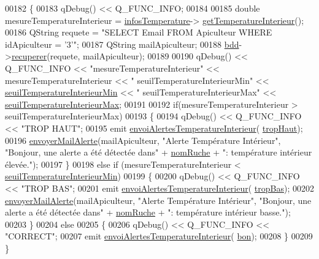 \begin{DoxyCode}
00182 \{
00183     qDebug() << Q\_FUNC\_INFO;
00184 
00185     \textcolor{keywordtype}{double} mesureTemperatureInterieur = \hyperlink{class_alertes_ad02b203545812ad6408befecc94ee0ec}{infosTemperature}->
      \hyperlink{class_infos_temperature_aaf4cb4fd8a7c46d14955d3175498f91c}{getTemperatureInterieur}();
00186     QString requete = \textcolor{stringliteral}{"SELECT Email FROM Apiculteur WHERE idApiculteur = '3'"};
00187     QString mailApiculteur;
00188     \hyperlink{class_alertes_a91e58b69d29922e8e984efb767ae5268}{bdd}->\hyperlink{class_base_de_donnees_a77539baad389f5acf754cd2cd452403e}{recuperer}(requete, mailApiculteur);
00189 
00190     qDebug() << Q\_FUNC\_INFO << \textcolor{stringliteral}{"mesureTemperatureInterieur"} << mesureTemperatureInterieur << \textcolor{stringliteral}{"
      seuilTemperatureInterieurMin"} << \hyperlink{class_alertes_a1c970252300a177bef641ca5399d3783}{seuilTemperatureInterieurMin} << \textcolor{stringliteral}{"
      seuilTemperatureInterieurMax"} << \hyperlink{class_alertes_abeda87298576a3b3eefcca9a96b8a0a9}{seuilTemperatureInterieurMax};
00191 
00192     \textcolor{keywordflow}{if}(mesureTemperatureInterieur > seuilTemperatureInterieurMax)
00193     \{
00194         qDebug() << Q\_FUNC\_INFO << \textcolor{stringliteral}{"TROP HAUT"};
00195         emit \hyperlink{class_alertes_a7726d5049a1453b6c22fafb33693bfe9}{envoiAlertesTemperatureInterieur}(
      \hyperlink{parametres_8h_aaa6de8207c94675264c90b10b613368dabc650d9700ae19f2696e6a6e3f9ab067}{tropHaut});
00196         \hyperlink{class_alertes_a375783502a78109f3323dc1ed90cfdc9}{envoyerMailAlerte}(mailApiculteur, \textcolor{stringliteral}{"Alerte Température Intérieur"}, \textcolor{stringliteral}{"Bonjour, une
       alerte a été détectée dans"}  + \hyperlink{class_alertes_a212f2a7185bcc7b11f3e54200272bdcf}{nomRuche} + \textcolor{stringliteral}{": température intérieur élevée."});
00197     \}
00198     \textcolor{keywordflow}{else} \textcolor{keywordflow}{if} (mesureTemperatureInterieur < \hyperlink{class_alertes_a1c970252300a177bef641ca5399d3783}{seuilTemperatureInterieurMin})
00199     \{
00200         qDebug() << Q\_FUNC\_INFO << \textcolor{stringliteral}{"TROP BAS"};
00201         emit \hyperlink{class_alertes_a7726d5049a1453b6c22fafb33693bfe9}{envoiAlertesTemperatureInterieur}(
      \hyperlink{parametres_8h_aaa6de8207c94675264c90b10b613368da4257e2f8921856770c8266f55c937295}{tropBas});
00202         \hyperlink{class_alertes_a375783502a78109f3323dc1ed90cfdc9}{envoyerMailAlerte}(mailApiculteur, \textcolor{stringliteral}{"Alerte Température Intérieur"}, \textcolor{stringliteral}{"Bonjour, une
       alerte a été détectée dans"}  + \hyperlink{class_alertes_a212f2a7185bcc7b11f3e54200272bdcf}{nomRuche} + \textcolor{stringliteral}{": température intérieur basse."});
00203     \}
00204     \textcolor{keywordflow}{else}
00205     \{
00206         qDebug() << Q\_FUNC\_INFO << \textcolor{stringliteral}{"CORRECT"};
00207         emit \hyperlink{class_alertes_a7726d5049a1453b6c22fafb33693bfe9}{envoiAlertesTemperatureInterieur}(
      \hyperlink{parametres_8h_aaa6de8207c94675264c90b10b613368da5ac8ec3b54d90a07c6bb5a77ef971821}{bon});
00208     \}
00209 \}
\end{DoxyCode}

